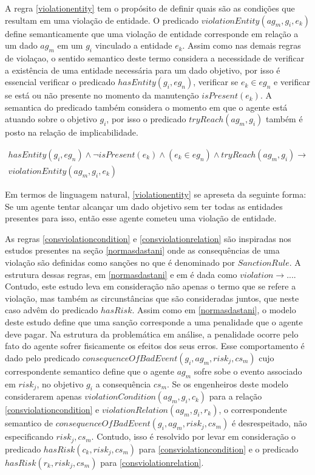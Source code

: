 A regra \ref{violationentity} tem o propósito de definir quais são as condições que resultam em uma violação de entidade. O predicado $violationEntity(ag_m,g_i,e_k)$ 
define semanticamente que uma violação de entidade corresponde em relação a um dado $ag_m$ em um $g_i$ vinculado a entidade $e_k$. Assim como nas demais
regras de violaçao, o sentido semantico deste termo considera a necessidade de verificar a existência de uma entidade necessária para um dado objetivo, 
por isso é essencial verificar o predicado $hasEntity(g_i,eg_n)$, verificar se $e_k \in eg_n$ e verificar se está ou não presente no momento da manutenção 
$isPresent(e_k)$. A semantica do predicado também considera o momento em que o agente está atuando sobre o objetivo $g_i$, por isso o predicado $tryReach(ag_m,g_i)$
também é posto na relação de implicabilidade.

\begin{eqnarray}\label{violationentity}\nonumber
	hasEntity(g_i,eg_n) \wedge \neg isPresent(e_k) 	\wedge (e_k \in eg_n) \wedge tryReach(ag_m,g_i) \to \nonumber \\ violationEntity(ag_m,g_i,e_k)  
\end{eqnarray}

Em termos de linguagem natural, \ref{violationentity} se apreseta da seguinte forma: Se um agente tentar alcançar um dado objetivo sem ter todas as entidades
presentes para isso, então esse agente cometeu uma violação de entidade.

As regras \ref{consviolationcondition} e \ref{consviolationrelation} são inspiradas nos estudos presentes na seção \ref{normasdastani} onde as consequências 
de uma violação são definidas como sanções no que é denominado por $Sanction Rule$. A estrutura dessas regras, em \ref{normasdastani} e em \cite{dastaniframework} 
é dada como $violation \to ... $. Contudo, este estudo leva em consideração não apenas o termo que se refere a violação, mas também as circunstâncias 
que são consideradas juntos, que neste caso advêm do predicado $hasRisk$. Assim como em \ref{normasdastani}, o modelo deste estudo define que uma sanção 
corresponde a uma penalidade que o agente deve pagar. Na estrutura da problemática em análise, a penalidade ocorre pelo fato do agente sofrer fisicamente 
os efeitos dos seus erros. Esse comportamento é dado pelo predicado $consequenceOfBadEvent(g_i,ag_m,risk_j,cs_m)$ cujo correspondente semantico define 
que o agente $ag_m$ sofre sobe o evento associado em $risk_j$, no objetivo $g_i$ a consequência $cs_m$. Se os engenheiros deste modelo considerarem 
apenas $violationCondition(ag_m,g_i,c_k)$ para a relação \ref{consviolationcondition} e $violationRelation(ag_m,g_i,r_k)$, o correspondente semantico de 
$consequenceOfBadEvent(g_i,ag_m,risk_j,cs_m)$ é desrespeitado, não especificando $risk_j,cs_m$. Contudo, isso é resolvido por levar em consideração 
o predicado $hasRisk(c_k,risk_j,cs_m)$ para \ref{consviolationcondition} e o predicado $hasRisk(r_k,risk_j,cs_m)$ para \ref{consviolationrelation}. 


